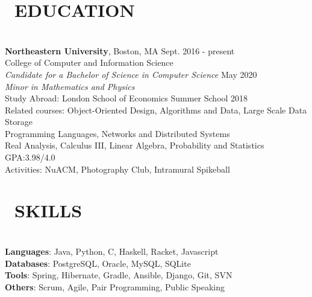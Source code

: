\documentclass[11pt]{res}
\newcommand{\sectionunderline}{\vspace{-3mm}\hrulefill\\}
\newcommand{\listingtab}{\tabto{3.5cm}}
\newcommand{\newsect}[1]{\section{\Large \bf #1}}
\newcommand{\email}[1]{\faEnvelope\hspace{1mm} \href{mailto:#1}{#1}}
\newcommand{\phone}[1]{\faMobilePhone\hspace{1mm} #1}
\newcommand{\github}[1]{\faGithubSquare\hspace{1mm} \href{https://github.com/#1}{#1}}
\newcommand{\linkedin}[1]{\faLinkedinSquare\hspace{1mm} \href{https://linkedin.com/in/#1}{#1}}
\begin{document}
\address{
  \small\phone{(802) 503-5089}\:
  \large{$\bullet$}
  \small\email{derekpham67@gmail.com}\:
  \large{$\bullet$}
  \small\github{derekpham}\:
  \large{$\bullet$}
  \small\linkedin{derek-pham97}\\
  \small Available: January - August 2019
}

\begin{resume}
  \newsect{\faGraduationCap\ EDUCATION}{
    \sectionunderline{
      {\bf \large Northeastern University}, Boston, MA \hfill Sept. 2016 - present\\
      College of Computer and Information Science}\\
                     {\it Candidate for a Bachelor of Science in Computer Science} \hfill May 2020\\
                     {\it Minor in Mathematics and Physics}\vspace{2mm}\\
                     Study Abroad: \listingtab London School of Economics Summer School \hfill 2018\\
                     Related courses:
                     \listingtab Object-Oriented Design, Algorithms and Data, Large Scale Data Storage\\
                     \listingtab Programming Languages, Networks and Distributed Systems\\
                     \listingtab Real Analysis, Calculus III, Linear Algebra, Probability and Statistics\\
                     GPA:\listingtab 3.98/4.0\\
                     Activities: \listingtab NuACM, Photography Club, Intramural Spikeball
  }

  \newsect{\faCogs\ SKILLS}{
    \sectionunderline{
      {\bf Languages}: \listingtab Java, Python, C, Haskell, Racket, Javascript\\
      {\bf Databases}: \listingtab PostgreSQL, Oracle, MySQL, SQLite\\
      {\bf Tools}: \listingtab Spring, Hibernate, Gradle, Ansible, Django, Git, SVN\\
      {\bf Others}: \listingtab Scrum, Agile, Pair Programming, Public Speaking
    }
  }


\end{resume}
\end{document}
